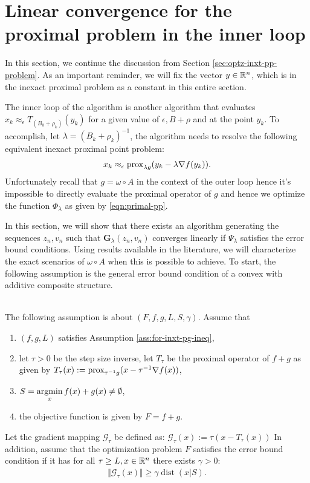 \documentclass[12pt]{article}
\DeclareMathOperator{\dist}{\mathop{dist}}
\begin{document}
\section{Linear convergence for the proximal problem in the inner loop}
    In this section, we continue the discussion from Section \ref{sec:optz-inxt-pp-problem}. 
    As an important reminder, we will fix the vector $y \in \mathbb R^n$, which is in the inexact proximal problem as a constant in this entire section. 
    \par
    The inner loop of the algorithm is another algorithm that evaluates $x_k \approx_\epsilon T_{(B_k + \rho_k)}(y_k)$ for a given value of $\epsilon, B + \rho$ and at the point $y_k$. 
    To accomplish, let $\lambda = (B_k + \rho_k)^{-1}$, the algorithm needs to resolve the following equivalent inexact proximal point problem: 
    \begin{align*}
        x_k \approx_\epsilon \operatorname{prox}_{\lambda g}(y_k - \lambda \nabla f(y_k)). 
    \end{align*}
    Unfortunately recall that $g = \omega \circ A$ in the context of the outer loop hence it's impossible to directly evaluate the proximal operator of $g$ and hence we optimize the function $\Phi_\lambda$ as given by \eqref{eqn:primal-pp}. 
    \par
    In this section, we will show that there exists an algorithm generating the sequences $z_n, v_n$ such that $\mathbf G_\lambda (z_n, v_n)$ converges linearly if $\Psi_\lambda$ satisfies the error bound conditions. 
    Using results available in the literature, we will characterize the exact scenarios of $\omega \circ A$ when this is possible to achieve. 
    To start, the following assumption is the general error bound condition of a convex with additive composite structure. 
    \begin{assumption}\;\label{ass:pg-eb}\\
        The following assumption is about $(F, f, g, L, S, \gamma)$. 
        Assume that
        \begin{enumerate}[nosep]
            \item $(f, g, L)$ satisfies Assumption \ref{ass:for-inxt-pg-ineq}, 
            \item let $\tau > 0$ be the step size inverse, let $T_{\tau}$ be the proximal operator of $f + g$ as given by $T_{\tau}(x) := \operatorname{prox}_{\tau^{-1}g}(x - \tau^{-1}\nabla f(x))$, 
            \item $S= \mathop{\rm argmin}\limits_{x}{f(x) + g(x)} \neq \emptyset$, 
            \item the objective function is given by $F = f + g$. 
        \end{enumerate}   
        Let the gradient mapping $\mathcal G_{\tau}$ be defined as: $\mathcal G_\tau(x) := \tau (x - T_\tau(x))$     
        In addition, assume that the optimization problem $F$ satisfies the error bound condition if it has for all $\tau \ge L, x \in \mathbb R^n$ there exists $\gamma > 0$: 
        \begin{align*}
            \Vert \mathcal G_\tau(x)\Vert \ge \gamma\dist(x|S). 
        \end{align*}
    \end{assumption}
\end{document}
